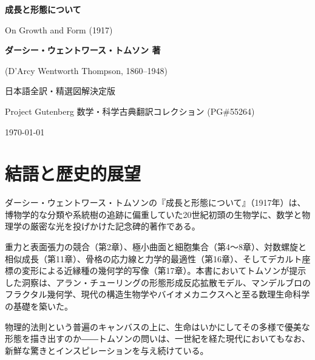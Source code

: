 \documentclass[a4paper,11pt,oneside,openany]{ltjsbook}
\begin{document}
\frontmatter
\begin{titlepage}
    \centering
    \vspace*{2cm}
    {\Huge\bfseries\sffamily 成長と形態について\par}
    \vspace{0.8cm}
    {\Large\sffamily On Growth and Form (1917)\par}
    \vspace{1.5cm}
    {\Large\bfseries ダーシー・ウェントワース・トムソン 著\par}
    {\small (D'Arcy Wentworth Thompson, 1860--1948)\par}
    \vspace{1.5cm}
    {\large 日本語全訳・精選図解決定版\par}
    \vfill
    {\large Project Gutenberg 数学・科学古典翻訳コレクション (PG\#55264)\par}
    {\small\today}
\end{titlepage}

\tableofcontents
\mainmatter






\chapter*{結語と歴史的展望}

ダーシー・ウェントワース・トムソンの『成長と形態について』（1917年）は、博物学的な分類や系統樹の追跡に偏重していた20世紀初頭の生物学に、数学と物理学の厳密な光を投げかけた記念碑的著作である。

重力と表面張力の競合（第2章）、極小曲面と細胞集合（第4〜8章）、対数螺旋と相似成長（第11章）、骨格の応力線と力学的最適性（第16章）、そしてデカルト座標の変形による近縁種の幾何学的写像（第17章）。本書においてトムソンが提示した洞察は、アラン・チューリングの形態形成反応拡散モデル、マンデルブロのフラクタル幾何学、現代の構造生物学やバイオメカニクスへと至る数理生命科学の基礎を築いた。

物理的法則という普遍のキャンバスの上に、生命はいかにしてその多様で優美な形態を描き出すのか――トムソンの問いは、一世紀を経た現代においてもなお、新鮮な驚きとインスピレーションを与え続けている。
\end{document}
